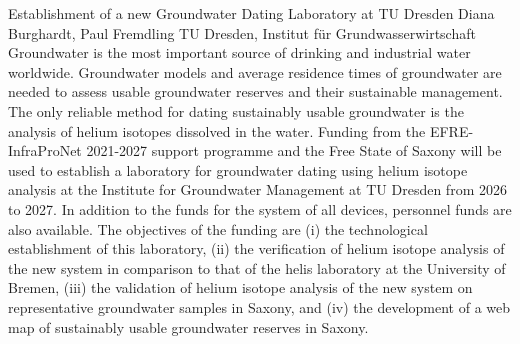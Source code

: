 \begin{conf-abstract}
{Establishment of a new Groundwater Dating Laboratory at TU Dresden}
{Diana Burghardt, Paul Fremdling}
{TU Dresden, Institut für Grundwasserwirtschaft}
{Groundwater is the most important source of drinking and industrial water worldwide. Groundwater models and average residence times of groundwater are needed to assess usable groundwater reserves and their sustainable management. The only reliable method for dating sustainably usable groundwater is the analysis of helium isotopes dissolved in the water. Funding from the EFRE-InfraProNet 2021-2027 support programme and the Free State of Saxony will be used to establish a laboratory for groundwater dating using helium isotope analysis at the Institute for Groundwater Management at TU Dresden from 2026 to 2027. In addition to the funds for the system of all devices, personnel funds are also available. The objectives of the funding are (i) the technological establishment of this laboratory, (ii) the verification of helium isotope analysis of the new system in comparison to that of the helis laboratory at the University of Bremen, (iii) the validation of helium isotope analysis of the new system on representative groundwater samples in Saxony, and (iv) the development of a web map of sustainably usable groundwater reserves in Saxony. }
\end{conf-abstract}
